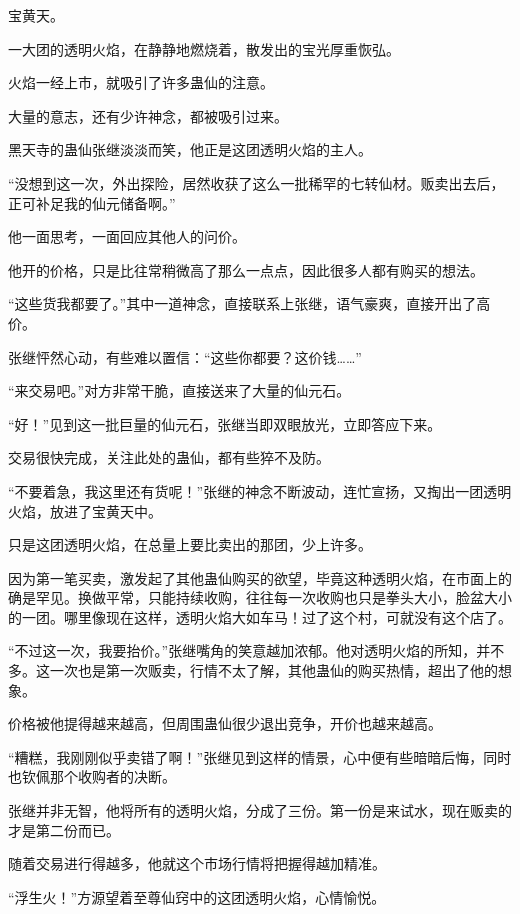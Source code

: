 
\begin{this_body}

宝黄天。

一大团的透明火焰，在静静地燃烧着，散发出的宝光厚重恢弘。

火焰一经上市，就吸引了许多蛊仙的注意。

大量的意志，还有少许神念，都被吸引过来。

黑天寺的蛊仙张继淡淡而笑，他正是这团透明火焰的主人。

“没想到这一次，外出探险，居然收获了这么一批稀罕的七转仙材。贩卖出去后，正可补足我的仙元储备啊。”

他一面思考，一面回应其他人的问价。

他开的价格，只是比往常稍微高了那么一点点，因此很多人都有购买的想法。

“这些货我都要了。”其中一道神念，直接联系上张继，语气豪爽，直接开出了高价。

张继怦然心动，有些难以置信：“这些你都要？这价钱……”

“来交易吧。”对方非常干脆，直接送来了大量的仙元石。

“好！”见到这一批巨量的仙元石，张继当即双眼放光，立即答应下来。

交易很快完成，关注此处的蛊仙，都有些猝不及防。

“不要着急，我这里还有货呢！”张继的神念不断波动，连忙宣扬，又掏出一团透明火焰，放进了宝黄天中。

只是这团透明火焰，在总量上要比卖出的那团，少上许多。

因为第一笔买卖，激发起了其他蛊仙购买的欲望，毕竟这种透明火焰，在市面上的确是罕见。换做平常，只能持续收购，往往每一次收购也只是拳头大小，脸盆大小的一团。哪里像现在这样，透明火焰大如车马！过了这个村，可就没有这个店了。

“不过这一次，我要抬价。”张继嘴角的笑意越加浓郁。他对透明火焰的所知，并不多。这一次也是第一次贩卖，行情不太了解，其他蛊仙的购买热情，超出了他的想象。

价格被他提得越来越高，但周围蛊仙很少退出竞争，开价也越来越高。

“糟糕，我刚刚似乎卖错了啊！”张继见到这样的情景，心中便有些暗暗后悔，同时也钦佩那个收购者的决断。

张继并非无智，他将所有的透明火焰，分成了三份。第一份是来试水，现在贩卖的才是第二份而已。

随着交易进行得越多，他就这个市场行情将把握得越加精准。

“浮生火！”方源望着至尊仙窍中的这团透明火焰，心情愉悦。


\end{this_body}
